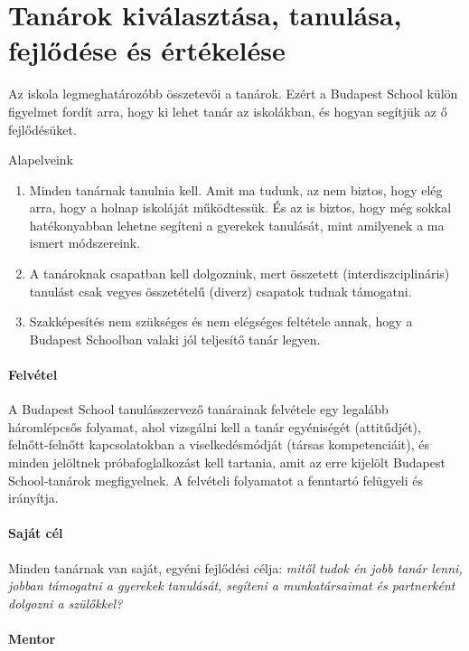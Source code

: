 \section{Tanárok kiválasztása, tanulása, fejlődése és értékelése}

Az iskola legmeghatározóbb összetevői a tanárok.
Ezért a Budapest School külön figyelmet fordít arra, hogy ki lehet tanár az
iskolákban, és hogyan segítjük az ő fejlődésüket.

Alapelveink
\begin{enumerate}
  \item Minden tanárnak tanulnia kell. Amit ma tudunk, az nem biztos, hogy elég
        arra, hogy a holnap iskoláját működtessük. És az is biztos, hogy még sokkal
        hatékonyabban lehetne segíteni a gyerekek tanulását, mint amilyenek a ma ismert
        módszereink.

  \item A tanároknak csapatban kell dolgozniuk, mert összetett
        (interdiszciplináris) tanulást csak vegyes összetételű (diverz) csapatok tudnak
        támogatni.

  \item Szakképesítés nem szükséges és nem elégséges feltétele annak, hogy a
        Budapest Schoolban valaki jól teljesítő tanár legyen.
\end{enumerate}

\paragraph{Felvétel}
A Budapest School tanulásszervező tanárainak felvétele egy legalább háromlépcsős
folyamat, ahol vizsgálni kell a tanár egyéniségét (attitűdjét), felnőtt-felnőtt
kapcsolatokban a viselkedésmódját (társas kompetenciáit), és minden jelöltnek
próbafoglalkozást kell tartania, amit az erre kijelölt Budapest School-tanárok
megfigyelnek. A felvételi folyamatot a fenntartó felügyeli és irányítja.

\paragraph{Saját cél}

Minden tanárnak van saját, egyéni fejlődési célja: \emph{mitől tudok én jobb
  tanár lenni, jobban támogatni a gyerekek tanulását, segíteni a munkatársaimat
  és partnerként dolgozni a szülőkkel?}

\paragraph{Mentor}


